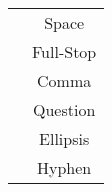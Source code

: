 \label{Cas:G}
\begin{tabular}{||c|c||}
\hline
\anglebracket	{\Cas{\whitespace}}	&	{Space}		\\
\anglebracket	{\Cas{.}}			&	{Full-Stop}	\\
\anglebracket	{\Cas{,}}			&	{Comma}		\\
\anglebracket	{\Cas{?}}			&	{Question}	\\
\anglebracket	{\Cas{...}}			&	{Ellipsis}	\\
\anglebracket	{\Cas{-}}			&	{Hyphen}	\\
\hline
\end{tabular}